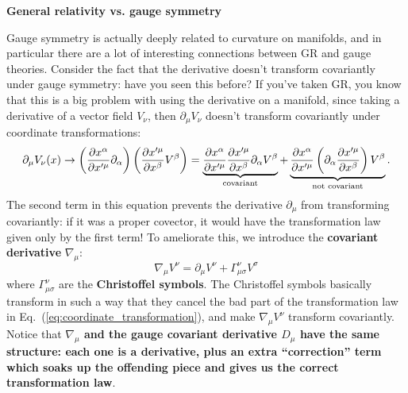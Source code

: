 \documentclass[12pt, oneside]{article}   	%
\theoremstyle{definition}
\begin{document}
\begin{itemize}
	\begin{answerbox}
		{\centering \textbf{General relativity vs. gauge symmetry} } \\
	
	\raggedright
	Gauge symmetry is actually deeply related to curvature on manifolds, and in particular there are a lot of interesting connections between GR and gauge theories. Consider the fact that the derivative doesn't transform covariantly under gauge symmetry: have you seen this before? If you've taken GR, you know that this is a big problem with using the derivative on a manifold, since taking a derivative of a vector field $V_\nu$, then $\partial_\mu V_\nu$ doesn't transform covariantly under coordinate transformations:
	\begin{equation}
		\partial_\mu V_\nu(x) \rightarrow \left(\frac{\partial x^{\alpha}}{\partial x^{\prime \mu}} \partial_\alpha\right) \left( \frac{\partial x^{\prime \mu}}{\partial x^\beta} V^\beta \right) = \underbrace{\frac{\partial x^{\alpha}}{\partial x^{\prime \mu}} \frac{\partial x^{\prime \mu}}{\partial x^\beta} \partial_\alpha V^\beta}_{\textnormal{covariant}} + \underbrace{ \frac{\partial x^{\alpha}}{\partial x^{\prime \mu}} \left(\partial_\alpha \frac{\partial x^{\prime \mu}}{\partial x^\beta}\right) V^\beta }_{\textnormal{not covariant}}. \label{eq:coordinate_transformation}
	\end{equation}
	The second term in this equation prevents the derivative $\partial_\mu$ from transforming covariantly: if it was a proper covector, it would have the transformation law given only by the first term! To ameliorate this, we introduce the \textbf{covariant derivative} $\nabla_\mu$:
	\begin{equation}
		\nabla_\mu V^\nu = \partial_\mu V^\nu + \Gamma^\nu_{\mu\sigma} V^\sigma
	\end{equation}
	where $\Gamma^\nu_{\mu\sigma}$ are the \textbf{Christoffel symbols}. The Christoffel symbols basically transform in such a way that they cancel the bad part of the transformation law in Eq.~(\ref{eq:coordinate_transformation}), and make $\nabla_\mu V^\nu$ transform covariantly. Notice that \textbf{$\nabla_\mu$ and the gauge covariant derivative $D_\mu$ have the same structure: each one is a derivative, plus an extra ``correction'' term which soaks up the offending piece and gives us the correct transformation law}. 
	

\end{answerbox}
\end{itemize}
\end{document}
